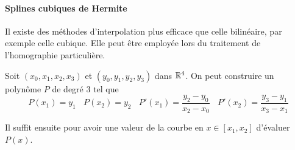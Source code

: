 \paragraph{Splines cubiques de Hermite}

Il existe des méthodes d'interpolation plus efficace que celle bilinéaire, par exemple celle cubique. Elle peut être employée lors du traitement de l'homographie particulière.

Soit $(x_0,x_1,x_2,x_3)$ et $(y_0,y_1,y_2,y_3)$ dans $\mathbb{R}^4$. On peut construire un polynôme $P$ de degré 3 tel que  
\begin{equation*}
P(x_1)=y_1~~~~P(x_2)=y_2~~~~P'(x_1)= \frac{y_2-y_0}{x_2 -x_0}~~~~P'(x_2)= \frac{y_3-y_1}{x_3 -x_1}
\end{equation*}

Il suffit ensuite pour avoir une valeur de la courbe en $x\in [x_1,x_2]$ d'évaluer $P(x)$.
